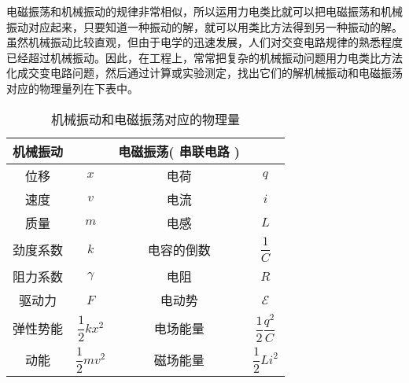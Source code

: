 
电磁振荡和机械振动的规律非常相似，所以运用力电类比就可以把电磁振荡和机械振动对应起来，只要知道一种振动的解，就可以用类比方法得到另一种振动的解。虽然机械振动比较直观，但由于电学的迅速发展，人们对交变电路规律的熟悉程度已经超过机械振动。因此，在工程上，常常把复杂的机械振动问题用力电类比方法化成交变电路问题，然后通过计算或实验测定，找出它们的解机械振动和电磁振荡对应的物理量列在下表中。

\begin{table}[ht]
\centering
\caption{机械振动和电磁振荡对应的物理量}\label{MeElec_tab1}
\begin{tabular}{cccc}
\hline  机械振动  & &  电磁振荡(  串联电路 ) &\\ \hline  位移  & $x$ &  电荷  & $q$ \\ \hline  速度  & $v $&  电流  & $i$ \\ \hline  质量  & $m$ &  电感  & $L$ \\ \hline  劲度系数  & $k$ &  电容的倒数  & $\dfrac1C$ \\ \hline  阻力系数  & $\gamma$ &  电阻  & $R$  \\ \hline  驱动力  &$F$ &  电动势  & $\mathscr E$  \\ \hline  弹性势能  &  $\dfrac12 k x^2$ &  电场能量  & $\dfrac12 \dfrac{q^2}C$ \\ \hline  动能  & $\dfrac12 m v^2$ &  磁场能量  &  $\dfrac12 L i^2$ \\ \hline
\end{tabular}
\end{table}
